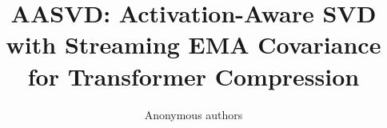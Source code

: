 \title{\textbf{AASVD: Activation-Aware SVD with Streaming EMA Covariance for Transformer Compression}}

\author{Anonymous authors}
